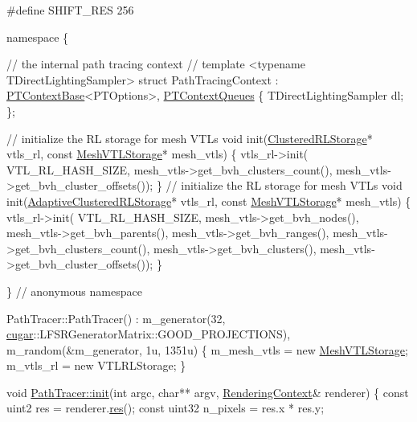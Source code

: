 \begin{DoxyCodeInclude}
\textcolor{preprocessor}{#define SHIFT\_RES   256}




\textcolor{keyword}{namespace }\{

    \textcolor{comment}{// the internal path tracing context}
    \textcolor{comment}{//}
    \textcolor{keyword}{template} <\textcolor{keyword}{typename} TDirectLightingSampler>
    \textcolor{keyword}{struct }PathTracingContext : \hyperlink{struct_p_t_context_base}{PTContextBase}<PTOptions>, 
      \hyperlink{struct_p_t_context_queues}{PTContextQueues}
    \{
        TDirectLightingSampler dl;
    \};

    \textcolor{comment}{// initialize the RL storage for mesh VTLs}
    \textcolor{keywordtype}{void} init(\hyperlink{struct_clustered_r_l_storage}{ClusteredRLStorage}* vtls\_rl, \textcolor{keyword}{const} 
      \hyperlink{struct_mesh_v_t_l_storage}{MeshVTLStorage}* mesh\_vtls)
    \{
        vtls\_rl->init(
            VTL\_RL\_HASH\_SIZE,
            mesh\_vtls->get\_bvh\_clusters\_count(),
            mesh\_vtls->get\_bvh\_cluster\_offsets());
    \}
    \textcolor{comment}{// initialize the RL storage for mesh VTLs}
    \textcolor{keywordtype}{void} init(\hyperlink{struct_adaptive_clustered_r_l_storage}{AdaptiveClusteredRLStorage}* vtls\_rl, \textcolor{keyword}{const} 
      \hyperlink{struct_mesh_v_t_l_storage}{MeshVTLStorage}* mesh\_vtls)
    \{
        vtls\_rl->init(
            VTL\_RL\_HASH\_SIZE,
            mesh\_vtls->get\_bvh\_nodes(),
            mesh\_vtls->get\_bvh\_parents(),
            mesh\_vtls->get\_bvh\_ranges(),
            mesh\_vtls->get\_bvh\_clusters\_count(),
            mesh\_vtls->get\_bvh\_clusters(),
            mesh\_vtls->get\_bvh\_cluster\_offsets());
    \}

\} \textcolor{comment}{// anonymous namespace}

PathTracer::PathTracer() :
    m\_generator(32, \hyperlink{namespacecugar}{cugar}::LFSRGeneratorMatrix::GOOD\_PROJECTIONS),
    m\_random(&m\_generator, 1u, 1351u)
\{
    m\_mesh\_vtls = \textcolor{keyword}{new} \hyperlink{struct_mesh_v_t_l_storage}{MeshVTLStorage};
    m\_vtls\_rl = \textcolor{keyword}{new} VTLRLStorage;
\}

\textcolor{keywordtype}{void} \hyperlink{group___p_t_module_details_ga923b8d146b23f93356f6c74971c4d6f7}{PathTracer::init}(\textcolor{keywordtype}{int} argc, \textcolor{keywordtype}{char}** argv, \hyperlink{struct_rendering_context}{RenderingContext}& renderer)
\{
    \textcolor{keyword}{const} uint2 res = renderer.\hyperlink{struct_rendering_context_ad1a58510bdaf6f373080835abf5db2db}{res}();
    \textcolor{keyword}{const} uint32 n\_pixels = res.x * res.y;


\end{DoxyCodeInclude}
